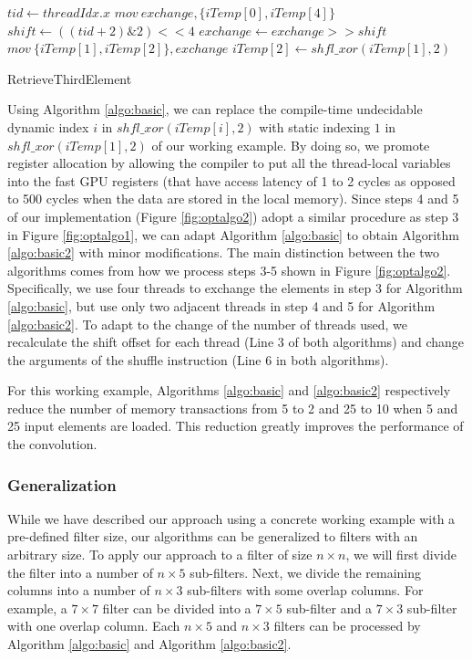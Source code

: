 \begin{algorithm}[t!]
\small

	$tid \gets threadIdx.x$\;
	$mov\ exchange, \{iTemp[0], iTemp[4]\}$\;
	$shift \gets ((tid+2)\&2)<<4$\;
	$exchange \gets exchange >> shift$\;
	$mov\ \{iTemp[1],iTemp[2]\}, exchange$\;
	$iTemp[2] \gets shfl\_xor(iTemp[1],2)$\;	
	
	\caption{RetrieveThirdElement}
	\label{algo:basic}
	
\end{algorithm}

Using Algorithm \ref{algo:basic}, we can replace the compile-time undecidable dynamic index $i$ in $shfl\_xor(iTemp[i],2)$ with static
indexing $1$ in $shfl\_xor(iTemp[1],2)$ of our working example. By doing so, we promote register allocation by allowing the compiler to put
all the thread-local variables into the fast GPU registers (that have access latency of 1 to 2 cycles as opposed to 500 cycles when the
data are stored in the local memory). Since steps 4 and 5 of our implementation (Figure \ref{fig:optalgo2}) adopt a similar procedure as
step 3 in Figure \ref{fig:optalgo1}, we can adapt Algorithm \ref{algo:basic} to obtain Algorithm \ref{algo:basic2} with minor
modifications. The main distinction between the two algorithms comes from how we process steps 3-5 shown in Figure \ref{fig:optalgo2}.
Specifically, we use four threads to exchange the elements in step 3 for Algorithm \ref{algo:basic}, but use only two adjacent threads in
step 4 and 5 for Algorithm \ref{algo:basic2}. To adapt to the change of the number of threads used, we recalculate the shift offset for
each thread (Line 3 of both algorithms) and change the arguments of the shuffle instruction (Line 6 in both algorithms).


For this working example, Algorithms \ref{algo:basic} and \ref{algo:basic2} respectively reduce the number of memory transactions from 5 to
2 and 25 to 10 when 5 and 25 input elements are loaded. This reduction greatly improves the performance of the convolution.

\subsubsection{Generalization} While we have described our approach using a concrete working example with a pre-defined filter size, our
algorithms can be generalized to filters with an arbitrary size. To apply our approach to a filter of size $n \times n$, we will first
divide the filter into a number of $n \times 5$ sub-filters. Next, we divide the remaining columns into a number of $n \times 3$ sub-filters
with some overlap columns. For example, a $7 \times 7$ filter can be divided into a $7 \times 5$ sub-filter and a $7 \times 3$ sub-filter
with one overlap column. Each $n \times 5$ and $n \times 3$ filters can be processed by Algorithm \ref{algo:basic} and Algorithm
\ref{algo:basic2}.






